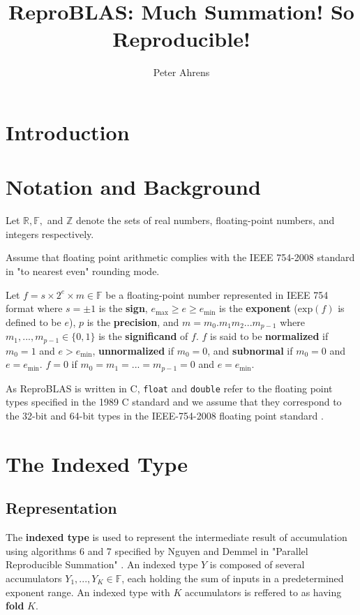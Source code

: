 \documentclass[12pt]{article}
\author{Peter Ahrens}
\title{ReproBLAS: Much Summation! So Reproducible!}
\providecommand{\R}{\ensuremath{\mathbb{R}}}
\providecommand{\F}{\ensuremath{\mathbb{F}}}
\providecommand{\Z}{\ensuremath{\mathbb{Z}}}
\providecommand{\exp}{\ensuremath{\text{exp}}}
\providecommand{\min}{\ensuremath{\text{min}}}
\providecommand{\max}{\ensuremath{\text{max}}}
\begin{document}
\noindent
\maketitle
\newpage
\section{Introduction}

\section{Notation and Background}
  Let $\R, \F, $ and $\Z$ denote the sets of real numbers, floating-point numbers, and integers respectively.

  Assume that floating point arithmetic complies with the IEEE 754-2008 standard in "to nearest even" rounding mode.

  Let $f = s \times 2^e \times m \in \F$ be a floating-point number represented in IEEE 754 format where $s = \pm 1$ is the \textbf{sign}, $e_{\max} \geq e \geq e_{\min}$ is the \textbf{exponent} ($\exp(f)$ is defined to be $e$), $p$ is the \textbf{precision}, and $m = m_0.m_1m_2...m_{p-1}$ where $m_1, ..., m_{p - 1} \in \{0, 1\}$ is the \textbf{significand} of $f$. $f$ is said to be \textbf{normalized} if $m_0 = 1$ and $e > e_{\min}$, \textbf{unnormalized} if $m_0 = 0$, and \textbf{subnormal} if $m_0 = 0$ and $e = e_{\min}$. $f = 0$ if $m_0 = m_1 = ... = m_{p - 1} = 0$ and $e = e_{\min}$.

  As ReproBLAS is written in C, \verb|float| and \verb|double| refer to the floating point types specified in the 1989 C standard \cite{c89} and we assume that they correspond to the 32-bit and 64-bit types in the IEEE-754-2008 floating point standard \cite{ieee754}.
\section{The Indexed Type}
  \subsection{Representation}
    The \textbf{indexed type} is used to represent the intermediate result of accumulation using algorithms 6 and 7 specified by Nguyen and Demmel in "Parallel Reproducible Summation" \cite{parallelreproduciblesummation}.
    An indexed type $Y$ is composed of several accumulators $Y_1, ..., Y_K \in \F$, each holding the sum of inputs in a predetermined exponent range. An indexed type with $K$ accumulators is reffered to as having \textbf{fold} $K$.
\end{document}
